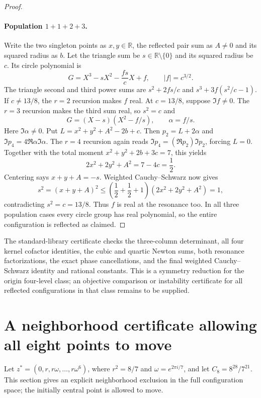 \documentclass[11pt]{article}
\theoremstyle{remark}
\numberwithin{equation}{section}
\begin{document}
\begin{proof}
\paragraph{Population $1+1+2+3$.}
Write the two singleton points as $x,y\in\mathbb R$, the reflected
pair sum as $A\ne0$ and its squared radius as $b$. Let the triangle
sum be $s\in\mathbb R\setminus\{0\}$ and its squared radius be $c$.
Its circle polynomial is
\[
             G=X^3-sX^2-\frac{fs}{c}X+f,
             \qquad |f|=c^{3/2}.
\]
The triangle second and third power sums are
$s^2+2fs/c$ and $s^3+3f(s^2/c-1)$.
If $c\ne13/8$, the $r=2$ recursion makes $f$ real.
At $c=13/8$, suppose $\Im f\ne0$. The $r=3$ recursion makes the
third sum real, so $s^2=c$ and
\[
 G=(X-s)(X^2-f/s),\qquad \alpha=f/s.
\]
Here $\Im\alpha\ne0$. Put
$L=x^2+y^2+A^2-2b+c$. Then
$p_2=L+2\alpha$ and $\Im p_4=4\Re\alpha\Im\alpha$.
The $r=4$ recursion again reads
$\Im p_4=(\Re p_2)\Im p_2$, forcing $L=0$.
Together with the total moment
$x^2+y^2+2b+3c=7$, this yields
\[
                       2x^2+2y^2+A^2=7-4c=\frac12.
\]
Centering says $x+y+A=-s$. Weighted Cauchy--Schwarz now gives
\[
 s^2=(x+y+A)^2
 \le\left(\frac12+\frac12+1\right)(2x^2+2y^2+A^2)=1,
\]
contradicting $s^2=c=13/8$. Thus $f$ is real at the resonance too.
In all three population cases every circle group has real polynomial,
so the entire configuration is reflected as claimed.
\end{proof}

The standard-library certificate
checks the three-column determinant, all four kernel cofactor
identities, the cubic and quartic Newton sums, both resonance
factorizations, the exact phase cancellations, and the final
weighted Cauchy--Schwarz identity and rational constants.
This is a symmetry reduction for the origin four-level class;
an objective comparison or instability certificate for all reflected
configurations in that class remains to be supplied.

\section{A neighborhood certificate allowing all eight points to move}
\label{sec:n8-full-neighborhood}
Let $z^*=(0,r,r\omega,\ldots,r\omega^6)$, where
$r^2=8/7$ and $\omega=e^{2\pi i/7}$, and let
$C_8=8^{28}/7^{21}$. This section gives an explicit neighborhood
exclusion in the full configuration space; the initially central
point is allowed to move.
\end{document}
